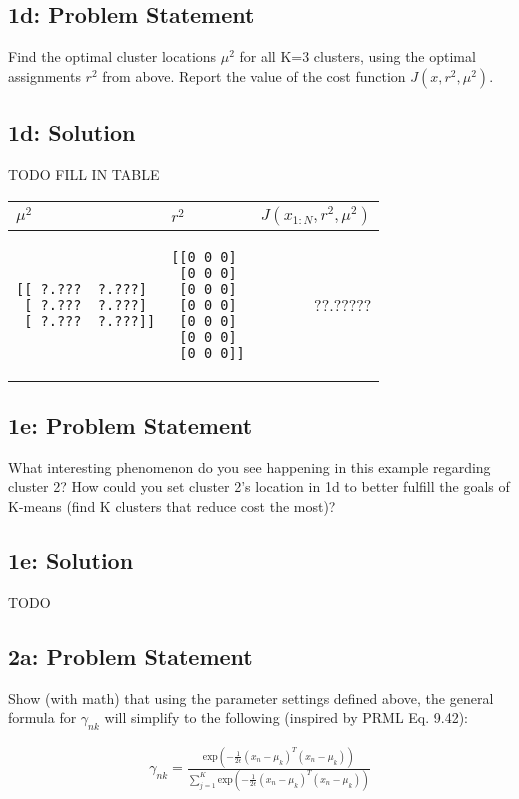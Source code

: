 \documentclass[10pt]{article}
\newcommand{\officialdirections}[1]{{\color{purple} #1}}
\begin{document}
\officialdirections{
\subsection*{1d: Problem Statement}
Find the optimal cluster locations $\mu^2$ for all K=3 clusters, using the optimal assignments $r^2$ from above. Report the value of the cost function $J(x,r^2,\mu^2)$.
}

\subsection{1d: Solution}
TODO FILL IN TABLE

\begin{tabular}{p{5cm} | p{5cm} | r}
$\mu^2$ & $r^2$ & $J(x_{1:N}, r^2, \mu^2)$
\\
\midrule
\begin{verbatim}
[[ ?.???  ?.???]
 [ ?.???  ?.???]
 [ ?.???  ?.???]]
\end{verbatim}
&	
\begin{verbatim}
[[0 0 0]
 [0 0 0]
 [0 0 0]
 [0 0 0]
 [0 0 0]
 [0 0 0]
 [0 0 0]]
\end{verbatim}
&
 ??.?????
\end{tabular}

\officialdirections{
\subsection*{1e: Problem Statement}
What interesting phenomenon do you see happening in this example regarding cluster 2? How could you set cluster 2's location in 1d to better fulfill the goals of K-means (find K clusters that reduce cost the most)?
}
\subsection{1e: Solution}

TODO


\officialdirections{
\subsection*{2a: Problem Statement}
Show (with math) that using the parameter settings defined above, the general formula for $\gamma_{nk}$ will simplify to the following (inspired by PRML Eq. 9.42):

\begin{align}
\gamma_{nk} = \frac
	{ \text{exp}( - \frac{1}{2\epsilon} (x_n - \mu_k)^T(x_n - \mu_k) )}
	{ \sum_{j=1}^K \text{exp}( - \frac{1}{2\epsilon} (x_n - \mu_k)^T (x_n - \mu_k) )}
\end{align}

}
\end{document}
